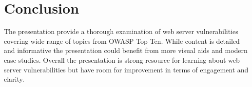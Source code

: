 \documentclass{article}
\begin{document}
\section{Conclusion}
The presentation provide a thorough examination of web server vulnerabilities covering wide range of topics from OWASP Top Ten. While content is detailed and informative the presentation could benefit from more visual aids and modern case studies. Overall the presentation is strong resource for learning about web server vulnerabilities but have room for improvement in terms of engagement and clarity.
\end{document}

